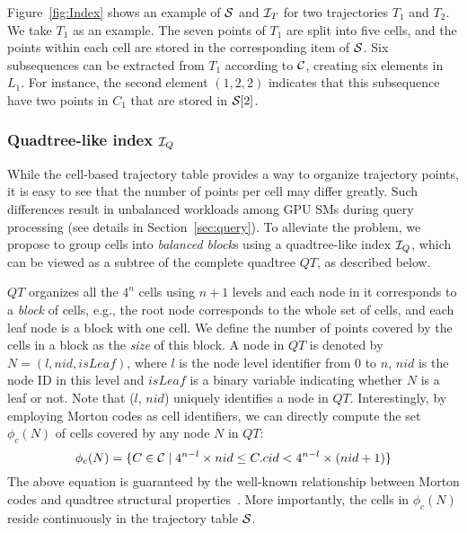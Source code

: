 \documentclass[10pt,conference,letterpaper]{IEEEtran}
\newcommand{\allcell}{{\cal C}\xspace}
\newcommand{\trajtable}{{\cal S}\xspace}
\newcommand{\trajindex}{{{\cal I}_T}\xspace}
\newcommand{\treeindex}{{{\cal I}_Q}\xspace}
\begin{document}
Figure~\ref{fig:Index} shows an example of $\trajtable$ and $\trajindex$ for two trajectories $T_1$ and $T_2$. We take $T_1$ as an example. The seven points of $T_1$ are split into five cells, and the points within each cell are stored in the corresponding item of $\trajtable$.
Six subsequences can be extracted from $T_1$ according to $\allcell$, creating six elements in $L_1$. For instance, the second element $(1,2,2)$ indicates that this subsequence have two points in $C_1$ that are stored in $\trajtable[2]$.


\subsubsection{Quadtree-like index $\treeindex$}
While the cell-based trajectory table provides a way to organize trajectory points, it is easy to see that the number of points per cell may differ greatly.
Such differences result in unbalanced workloads among GPU SMs during query processing (see details in Section~\ref{sec:query}). To alleviate the problem, we propose to group cells into \emph{balanced block}s using a quadtree-like index $\treeindex$,
which can be viewed as a subtree of the complete quadtree $QT$, as described below.

$QT$ organizes all the $4^n$ cells using $n+1$ levels and each node in it corresponds to a \emph{block} of cells, e.g., the root node corresponds to the whole set of cells, and each leaf node is a block with one cell. We define the number of points covered by the cells in a block as the \emph{size} of this block.
A node in $QT$ is denoted by $N=(l, nid, isLeaf)$, where $l$ is the node level identifier from $0$ to $n$, $nid$ is the node ID in this level and $isLeaf$ is a binary variable indicating whether $N$ is a leaf or not.
Note that ($l$, $nid$) uniquely identifies a node in $QT$.
Interestingly, by employing Morton codes as cell identifiers, we can directly compute the set $\phi_c(N)$ of cells covered by any node $N$ in $QT$:
\begin{equation}\label{eq:nodetocell}
\small
\phi_c(N) = \{C\in\allcell \mid 4^{n-l}\times nid \leq C.cid < 4^{n-l}\times (nid+1)  \}
\end{equation}
The above equation is guaranteed by the well-known relationship between Morton codes and quadtree structural properties~\cite{DBLP:conf/gis/LettichOS15}.
More importantly, the cells in $\phi_c(N)$ reside continuously in the trajectory table $\trajtable$.
\end{document}
